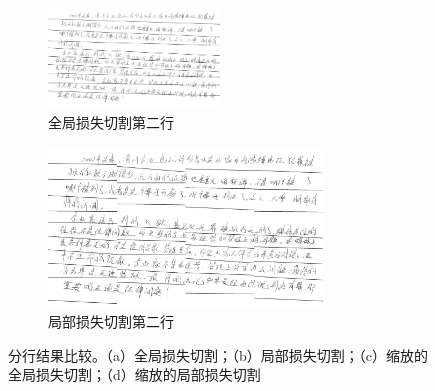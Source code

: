 \begin{figure}[ht!]
	
	\begin{subfigure}{.49\textwidth}
		\centering
		\includegraphics[width=0.5\textwidth]{figure/line1.png}
		\caption{全局损失切割第二行}
		\label{fig:line1}
	\end{subfigure}
	\begin{subfigure}{.49\textwidth}
		\centering
		\includegraphics[width=0.8\textwidth]{figure/line2.png}
		\caption{局部损失切割第二行}
		\label{fig:line2}
	\end{subfigure}
	\caption{分行结果比较。（a）全局损失切割；（b）局部损失切割；（c）缩放的全局损失切割；（d）缩放的局部损失切割}
	\label{fig:multi}
\end{figure}

\newpage %


